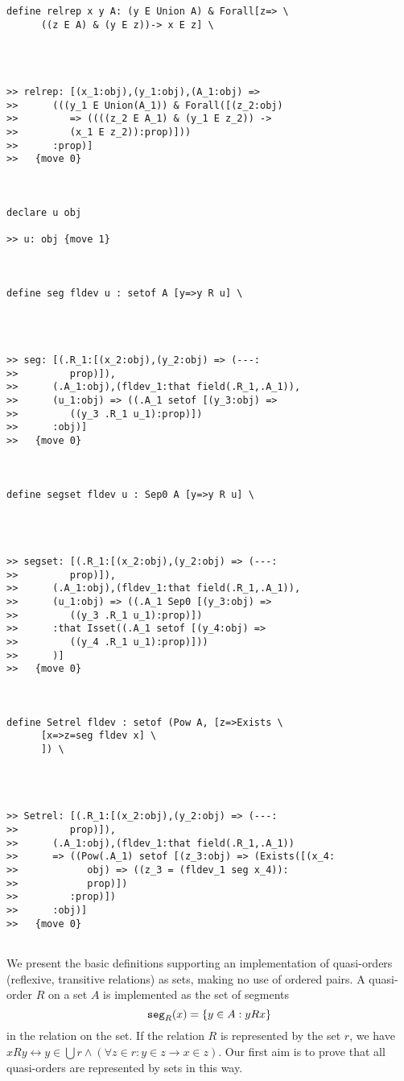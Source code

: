 \documentclass{article}
\begin{document}
\begin{verbatim}
define relrep x y A: (y E Union A) & Forall[z=> \
      ((z E A) & (y E z))-> x E z] \
   



>> relrep: [(x_1:obj),(y_1:obj),(A_1:obj) =>
>>      (((y_1 E Union(A_1)) & Forall([(z_2:obj)
>>         => ((((z_2 E A_1) & (y_1 E z_2)) ->
>>         (x_1 E z_2)):prop)]))
>>      :prop)]
>>   {move 0}



declare u obj

>> u: obj {move 1}



define seg fldev u : setof A [y=>y R u] \
   



>> seg: [(.R_1:[(x_2:obj),(y_2:obj) => (---:
>>         prop)]),
>>      (.A_1:obj),(fldev_1:that field(.R_1,.A_1)),
>>      (u_1:obj) => ((.A_1 setof [(y_3:obj) =>
>>         ((y_3 .R_1 u_1):prop)])
>>      :obj)]
>>   {move 0}



define segset fldev u : Sep0 A [y=>y R u] \
   



>> segset: [(.R_1:[(x_2:obj),(y_2:obj) => (---:
>>         prop)]),
>>      (.A_1:obj),(fldev_1:that field(.R_1,.A_1)),
>>      (u_1:obj) => ((.A_1 Sep0 [(y_3:obj) =>
>>         ((y_3 .R_1 u_1):prop)])
>>      :that Isset((.A_1 setof [(y_4:obj) =>
>>         ((y_4 .R_1 u_1):prop)]))
>>      )]
>>   {move 0}



define Setrel fldev : setof (Pow A, [z=>Exists \
      [x=>z=seg fldev x] \
      ]) \
   



>> Setrel: [(.R_1:[(x_2:obj),(y_2:obj) => (---:
>>         prop)]),
>>      (.A_1:obj),(fldev_1:that field(.R_1,.A_1))
>>      => ((Pow(.A_1) setof [(z_3:obj) => (Exists([(x_4:
>>            obj) => ((z_3 = (fldev_1 seg x_4)):
>>            prop)])
>>         :prop)])
>>      :obj)]
>>   {move 0}


\end{verbatim}

We present the basic definitions supporting an implementation of quasi-orders (reflexive, transitive relations) as sets, making no use of ordered pairs.
A quasi-order $R$ on a set $A$ is implemented as the set of segments $${\tt seg}_R(x) =\{y \in A: y R x\}$$ in the relation on the set.  If the relation $R$ is represented by the set $r$, we have
$x R y \leftrightarrow y \in \bigcup r \wedge (\forall z \in r:y \in z \rightarrow x \in z)$.  Our first aim is to prove that all quasi-orders are represented by sets in this way.
\end{document}
